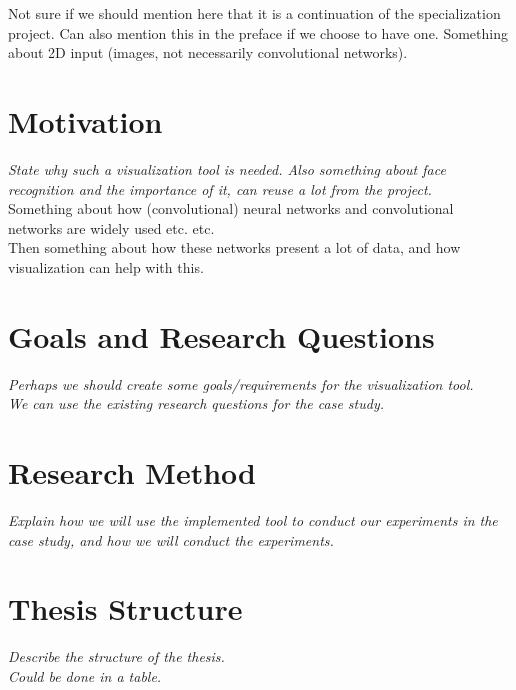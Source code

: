 \noindent Not sure if we should mention here that it is a continuation of the specialization project. Can also mention this in the preface if we choose to have one.
\noindent Something about 2D input (images, not necessarily convolutional networks).

\section{Motivation}

\textit{State why such a visualization tool is needed. Also something about face recognition and the importance of it, can reuse a lot from the project.} \\

\noindent Something about how (convolutional) neural networks and convolutional networks are widely used etc. etc. \\

\noindent Then something about how these networks present a lot of data, and how visualization can help with this.

\section{Goals and Research Questions}

\textit{Perhaps we should create some goals/requirements for the visualization tool. \\
We can use the existing research questions for the case study.}

\section{Research Method}

\textit{Explain how we will use the implemented tool to conduct our experiments in the case study, and how we will conduct the experiments.}

\section{Thesis Structure}

\textit{Describe the structure of the thesis. \\
Could be done in a table.}

\cleardoublepage